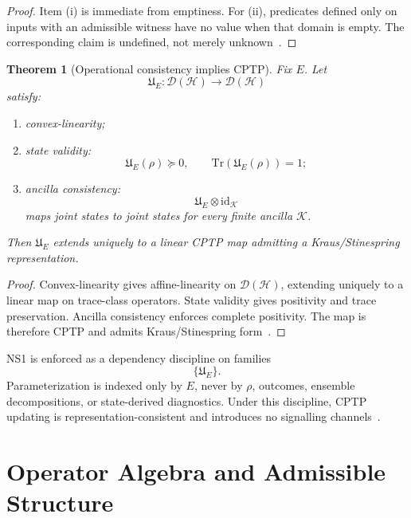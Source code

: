 \documentclass[aps,prx,onecolumn,11pt]{revtex4-2}
\theoremstyle{plain}
\newtheorem{theorem}{Theorem}
\theoremstyle{definition}
\theoremstyle{remark}
\begin{document}
\begin{proof}
Item (i) is immediate from emptiness. For (ii), predicates defined only
on inputs with an admissible witness have no value when that domain is
empty. The corresponding claim is undefined, not merely
unknown~\cite{Isham1995,AbramskyBrandenburger2011}.
\end{proof}

\begin{theorem}[Operational consistency implies CPTP]
\label{thm:operational_consistency_implies_cptp}
Fix \(E\). Let
\[
\mathfrak{U}_E:
\mathcal{D}(\mathcal{H})
\to
\mathcal{D}(\mathcal{H})
\]
satisfy:

\begin{enumerate}[label=(\roman*), leftmargin=2.2em]
\item convex-linearity;
\item state validity:
\[
\mathfrak{U}_E(\rho)\succeq 0,
\qquad
\mathrm{Tr}(\mathfrak{U}_E(\rho))=1;
\]
\item ancilla consistency:
\[
\mathfrak{U}_E\otimes\mathrm{id}_{\mathcal K}
\]
maps joint states to joint states for every finite ancilla
\(\mathcal K\).
\end{enumerate}

Then \(\mathfrak{U}_E\) extends uniquely to a linear CPTP map admitting
a Kraus/Stinespring representation.
\end{theorem}

\begin{proof}
Convex-linearity gives affine-linearity on
\(\mathcal{D}(\mathcal{H})\), extending uniquely to a linear map on
trace-class operators. State validity gives positivity and trace
preservation. Ancilla consistency enforces complete positivity. The map
is therefore CPTP and admits Kraus/Stinespring
form~\cite{Choi1975,Stinespring1955,Watrous2018}.
\end{proof}

NS1 is enforced as a dependency discipline on families
\[
\{\mathfrak{U}_E\}.
\]
Parameterization is indexed only by \(E\), never by \(\rho\), outcomes,
ensemble decompositions, or state-derived diagnostics. Under this
discipline, CPTP updating is representation-consistent and introduces
no signalling channels~\cite{Gisin1989,Gisin1990,Polchinski1991}.

\section{Operator Algebra and Admissible Structure}
\label{sec:operator_algebra}
\end{document}
